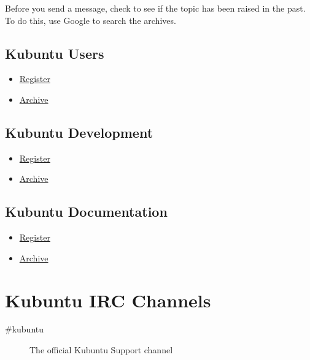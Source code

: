 \documentclass[letterpaper,10pt,english]{sphinxmanual}
\begin{document}
Before you send a message, check to see if the topic has been raised in the past. To do this, use Google to search the archives.


\subsection{Kubuntu Users}
\label{docs/contribute:kubuntu-users}\begin{itemize}
\item {} 
\href{https://lists.ubuntu.com/mailman/listinfo/kubuntu-users}{Register}

\item {} 
\href{https://lists.ubuntu.com/archives/kubuntu-users}{Archive}

\end{itemize}


\subsection{Kubuntu Development}
\label{docs/contribute:kubuntu-development}\begin{itemize}
\item {} 
\href{https://lists.ubuntu.com/mailman/listinfo/kubuntu-devel}{Register}

\item {} 
\href{https://lists.ubuntu.com/archives/kubuntu-devel}{Archive}

\end{itemize}


\subsection{Kubuntu Documentation}
\label{docs/contribute:kubuntu-documentation}\begin{itemize}
\item {} 
\href{https://lists.ubuntu.com/mailman/listinfo/ubuntu-doc}{Register}

\item {} 
\href{https://lists.ubuntu.com/archives/ubuntu-doc}{Archive}

\end{itemize}


\section{Kubuntu IRC Channels}
\label{docs/contribute:kubuntu-irc-channels}\begin{description}
\item[{\#kubuntu}] \leavevmode
The official Kubuntu Support channel

\end{description}
\end{document}
